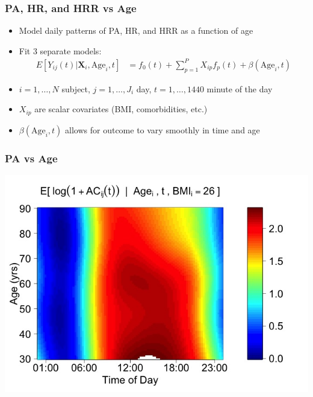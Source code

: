 \documentclass[10pt]{beamer}\usepackage[]{graphicx}\usepackage[]{color}
\begin{document}
\begin{frame}
\frametitle{PA, HR, and HRR vs Age}
\begin{itemize}
\item Model daily patterns of PA, HR, and HRR as a function of age
\item Fit 3 separate models:
\begin{align*}
E[Y_{ij}(t)|\mathbf{X}_i, \text{Age}_i, t] &= f_0(t) + \sum_{p=1}^P X_{ip}f_p(t) + \beta(\text{Age}_i,t)
\end{align*}
\item $i = 1,\ldots,N$ subject, $j= 1,\ldots,J_i$ day, $t = 1,\ldots,1440$ minute of the day
\item $X_{ip}$ are scalar covariates (BMI, comorbidities, etc.)
\item $\beta(\text{Age}_i,t)$ allows for outcome to vary smoothly in time and age
\end{itemize}
\end{frame}



\begin{frame}
\frametitle{PA vs Age}
\begin{center}
\includegraphics[height=\textheight]{coef_AC_mar.jpeg}
\end{center}
\end{frame}
\end{document}

